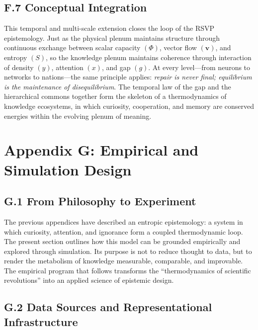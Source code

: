 \documentclass[11pt,a4paper,titlepage]{article}
\theoremstyle{definition}
\begin{document}
\begin{itemize}
\subsection*{F.7 Conceptual Integration}

This temporal and multi-scale extension closes the loop of the RSVP epistemology.
Just as the physical plenum maintains structure through continuous
exchange between scalar capacity $(\Phi)$, vector flow $(\mathbf{v})$, and entropy $(S)$,
so the knowledge plenum maintains coherence through interaction
of density $(y)$, attention $(x)$, and gap $(g)$.
At every level—from neurons to networks to nations—the same principle applies:
\emph{repair is never final; equilibrium is the maintenance of disequilibrium}.
The temporal law of the gap and the hierarchical commons together
form the skeleton of a thermodynamics of knowledge ecosystems,
in which curiosity, cooperation, and memory are conserved energies
within the evolving plenum of meaning.

\section*{Appendix G: Empirical and Simulation Design}
\label{app:empirical-simulation}

\subsection*{G.1 From Philosophy to Experiment}

The previous appendices have described an entropic epistemology: a system in which curiosity, attention, and ignorance form a coupled thermodynamic loop.  The present section outlines how this model can be grounded empirically and explored through simulation.  Its purpose is not to reduce thought to data, but to render the metabolism of knowledge measurable, comparable, and improvable.  
The empirical program that follows transforms the ``thermodynamics of scientific revolutions'' into an applied science of epistemic design.

\subsection*{G.2 Data Sources and Representational Infrastructure}


\end{itemize}
\end{document}
